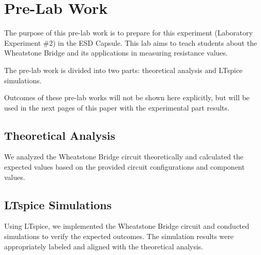 \chapter{Pre-Lab Work}

The purpose of this pre-lab work is to prepare for this experiment (Laboratory Experiment \#2) in the ESD Capsule. This lab aims to teach students about the Wheatstone Bridge and its applications in measuring resistance values.

The pre-lab work is divided into two parts: theoretical analysis and LTspice simulations.

Outcomes of these pre-lab works will not be shown here explicitly, but will be used in the next pages of this paper with the experimental part results.

\section{Theoretical Analysis}
We analyzed the Wheatstone Bridge circuit theoretically and calculated the expected values based on the provided circuit configurations and component values.

\section{LTspice Simulations}
Using LTspice, we implemented the Wheatstone Bridge circuit and conducted simulations to verify the expected outcomes. The simulation results were appropriately labeled and aligned with the theoretical analysis.
